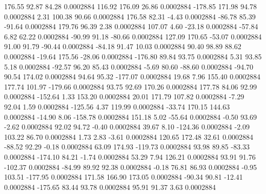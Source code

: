       176.55       92.87       84.28     0.0002884
      116.92      176.09       26.86     0.0002884
     -178.85      171.98       94.78     0.0002884
        2.31      100.38       90.66     0.0002884
      176.58       82.31       -4.43     0.0002884
      -86.78       85.39      -91.64     0.0002884
      179.76       96.39        2.38     0.0002884
      107.07        4.60      -23.18     0.0002884
      -57.84        6.82       62.22     0.0002884
      -90.99       91.18      -80.66     0.0002884
      127.09      170.65      -53.07     0.0002884
       91.00       91.79      -90.44     0.0002884
      -84.18       91.47       10.03     0.0002884
       90.40       98.89       88.62     0.0002884
      -19.64      175.56      -28.06     0.0002884
     -176.80       89.84       93.75     0.0002884
        5.31       93.85        5.18     0.0002884
      -92.57       96.20       85.43     0.0002884
       -5.69       80.60      -88.60     0.0002884
      -94.70       90.54      174.02     0.0002884
       94.64       95.32     -177.07     0.0002884
       19.68        7.96      155.40     0.0002884
      177.74      101.97     -179.66     0.0002884
       93.75       92.69      170.26     0.0002884
      177.78       84.06       92.99     0.0002884
     -152.64        1.33      153.20     0.0002884
       20.01      171.79      107.82     0.0002884
       -7.29       92.04        1.59     0.0002884
     -125.56        4.37      119.99     0.0002884
      -33.74      170.15      144.63     0.0002884
      -14.90        8.06     -158.78     0.0002884
      151.18        5.02      -55.64     0.0002884
       -0.50       93.69       -2.62     0.0002884
       92.02       94.72       -0.40     0.0002884
       39.67        8.10     -124.36     0.0002884
       -2.09      103.22       86.70     0.0002884
        1.73        2.83       -3.61     0.0002884
      120.65      172.48       32.61     0.0002884
      -88.52       92.29       -0.18     0.0002884
       63.09      174.93     -119.73     0.0002884
       93.98       89.85      -83.33     0.0002884
     -174.10       84.21       -1.74     0.0002884
       53.29        7.94      126.21     0.0002884
       93.91       91.76     -102.37     0.0002884
      -84.99       89.92       92.38     0.0002884
       -0.18       76.81       86.93     0.0002884
       -0.95      103.51     -177.95     0.0002884
      171.58      166.90      173.05     0.0002884
      -90.34       90.81      -12.41     0.0002884
     -175.65       83.44       93.78     0.0002884
       95.91       91.37        3.63     0.0002884
